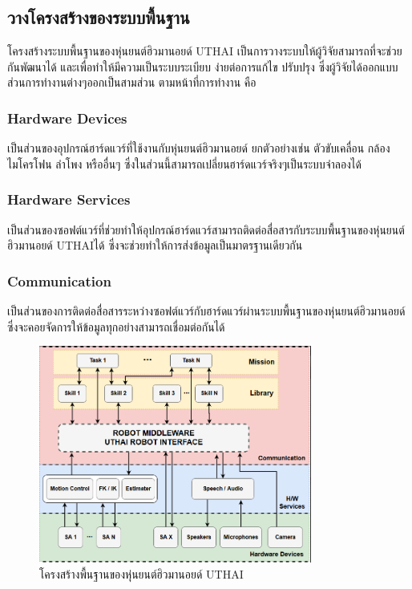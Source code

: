 \subsection{วางโครงสร้างของระบบพื้นฐาน}
โครงสร้างระบบพื้นฐานของหุ่นยนต์ฮิวมานอยด์ UTHAI เป็นการวางระบบให้ผู้วิจัยสามารถที่จะช่วยกันพัฒนาได้
และเพื่อทำให้มีความเป็นระบบระเบียบ ง่ายต่อการแก้ไข ปรับปรุง
ซึ่งผู้วิจัยได้ออกแบบส่วนการทำงานต่างๆออกเป็นสามส่วน ตามหน้าที่การทำงาน คือ

\subsubsection*{Hardware Devices}
เป็นส่วนของอุปกรณ์ฮาร์ดแวร์ที่ใช้งานกับหุ่นยนต์ฮิวมานอยด์ ยกตัวอย่างเช่น ตัวขับเคลื่อน กล้อง ไมโครโฟน ลำโพง
หรืออื่นๆ ซึ่งในส่วนนี้สามารถเปลี่ยนฮาร์ดแวร์จริงๆเป็นระบบจำลองได้

\subsubsection*{Hardware Services}
เป็นส่วนของซอฟต์แวร์ที่ช่วยทำให้อุปกรณ์ฮาร์ดแวร์สามารถติดต่อสื่อสารกับระบบพื้นฐานของหุ่นยนต์ฮิวมานอยด์ UTHAIได้
ซึ่งจะช่วยทำให้การส่งข้อมูลเป็นมาตรฐานเดียวกัน

\subsubsection*{Communication}
เป็นส่วนของการติดต่อสื่อสารระหว่างซอฟต์แวร์กับฮาร์ดแวร์ผ่านระบบพื้นฐานของหุ่นยนต์ฮิวมานอยด์ ซึ่งจะคอยจัดการให้ข้อมูลทุกอย่างสามารถเชื่อมต่อกันได้
\begin{figure}[!ht]
	\centering
	\includegraphics[width=0.8\textwidth]{chapter3/images/uthai_diagram.png}
	\caption{โครงสร้างพื้นฐานของหุ่นยนต์ฮิวมานอยด์ UTHAI}
	\label{fig:uthai_diagram}
\end{figure}

